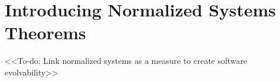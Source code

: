 \section{Introducing Normalized Systems Theorems}
<<To-do: Link normalized systems as a measure to create software evolvability>>
